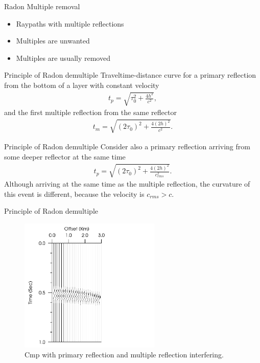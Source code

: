 \documentclass[xcolor=dvipsnames,notes]{beamer}
\begin{document}
%
%
\begin{frame}{Radon Multiple removal}
%
\begin{itemize}
  \item Raypaths with multiple reflections
  \item Multiples are unwanted
  \item Multiples are usually removed
\end{itemize}
\end{frame}
%
\begin{frame}{Principle of Radon demultiple}
Traveltime-distance curve for a primary
reflection from the bottom of a layer with constant velocity
%
\begin{eqnarray}
    t_p=\sqrt{\tau^2_0 + \frac{4h^2}{c^2}},
\end{eqnarray}
%
and the first multiple reflection from the same reflector
%
\begin{eqnarray}
    t_m=\sqrt{{(2\tau_0)}^2 + \frac{ 4{(2h)}^2}{c^2}}.
\end{eqnarray}
%
\end{frame}
%
\begin{frame}{Principle of Radon demultiple}
Consider also a primary reflection arriving  from some deeper
reflector at the same time 
%
\begin{eqnarray}
    t_p=\sqrt{{(2\tau_0)}^2 + \frac{ 4{(2h)}^2}{c_{rms}^2}}.
\end{eqnarray}
%
Although arriving at the same time as the multiple reflection, the curvature of
this event is different, because the velocity is $c_{rms} > c$.
\end{frame}
\begin{frame}{Principle of Radon demultiple}
%
\begin{figure}
\includegraphics[width=0.6\textwidth]{Fig/fig-6-cdp.pdf}
\caption{Cmp with primary reflection and multiple reflection interfering.}
\label{fig-6-cdp}
\end{figure}
\end{frame}
\end{document}
